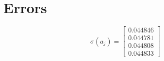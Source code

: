 \section{Errors}

\begin{equation}
\sigma\left(a_j\right) = 
\left[
\begin{array}{c}
 0.044846 \\
 0.044781 \\
 0.044808 \\
 0.044833
\end{array}
\right]
\end{equation}